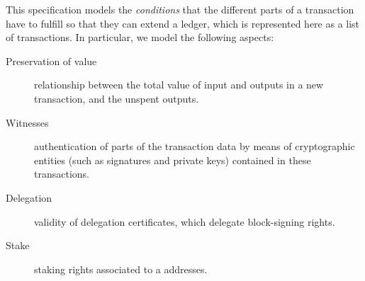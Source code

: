 This specification models the \textit{conditions} that the different parts of a
transaction have to fulfill so that they can extend a ledger, which is
represented here as a list of transactions. In particular, we model the
following aspects:

\begin{description}
\item[Preservation of value] relationship between the total value of input and
  outputs in a new transaction, and the unspent outputs.
\item[Witnesses] authentication of parts of the transaction data by means of
  cryptographic entities (such as signatures and private keys) contained in
  these transactions.
\item[Delegation] validity of delegation certificates, which delegate
  block-signing rights.
\item[Stake] staking rights associated to a addresses.
\end{description}

